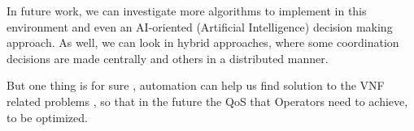 In future work, we can investigate more algorithms to implement in this environment and even an AI-oriented (Artificial Intelligence) decision making approach.
As well, we can look in  hybrid approaches, where some coordination decisions are
made centrally and others in a distributed manner.

But one thing is for sure , automation can help us find solution to the VNF related problems , so that in the future the QoS that Operators need to achieve, to be optimized.